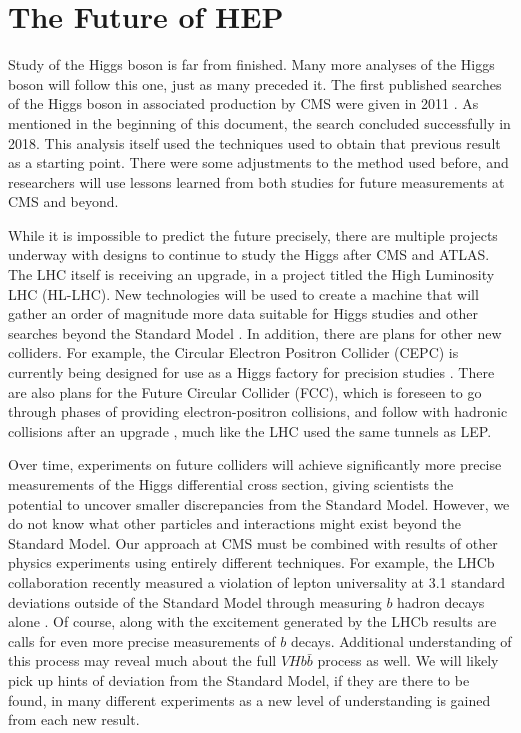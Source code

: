 \section{The Future of HEP}

Study of the Higgs boson is far from finished.
Many more analyses of the Higgs boson will follow this one, just as many preceded it.
The first published searches of the Higgs boson in associated production by CMS
were given in 2011 \cite{CMS-PAS-HIG-11-012}.
As mentioned in the beginning of this document, the search concluded successfully in 2018.
This analysis itself used the techniques used to obtain that previous result as a starting point.
There were some adjustments to the method used before, and
researchers will use lessons learned from both studies for future measurements at CMS and beyond.

While it is impossible to predict the future precisely,
there are multiple projects underway with designs to continue to study the Higgs after CMS and ATLAS.
The LHC itself is receiving an upgrade, in a project titled the High Luminosity LHC (HL-LHC).
New technologies will be used to create a machine that will gather
an order of magnitude more data suitable for Higgs studies and
other searches beyond the Standard Model \cite{osti_1365580}.
In addition, there are plans for other new colliders.
For example, the Circular Electron Positron Collider (CEPC) is currently being designed
for use as a Higgs factory for precision studies \cite{thecepcstudygroup2018cepc}.
There are also plans for the Future Circular Collider (FCC),
which is foreseen to go through phases of providing electron-positron collisions,
and follow with hadronic collisions after an upgrade \cite{benedikt2020future},
much like the LHC used the same tunnels as LEP.

Over time, experiments on future colliders will achieve significantly more precise measurements
of the Higgs differential cross section,
giving scientists the potential to uncover smaller discrepancies from the Standard Model.
However, we do not know what other particles and interactions might exist beyond the Standard Model.
Our approach at CMS must be combined with results of other physics experiments using entirely different techniques.
For example, the LHCb collaboration recently measured a violation of lepton universality
at 3.1 standard deviations outside of the Standard Model through measuring $b$ hadron decays alone
\cite{lhcbcollaboration2021test}.
Of course, along with the excitement generated by the LHCb results are calls for
even more precise measurements of $b$ decays.
Additional understanding of this process may reveal much about the full $V\!Hb\bar{b}$ process as well.
We will likely pick up hints of deviation from the Standard Model, if they are there to be found,
in many different experiments as a new level of understanding is gained from each new result.
